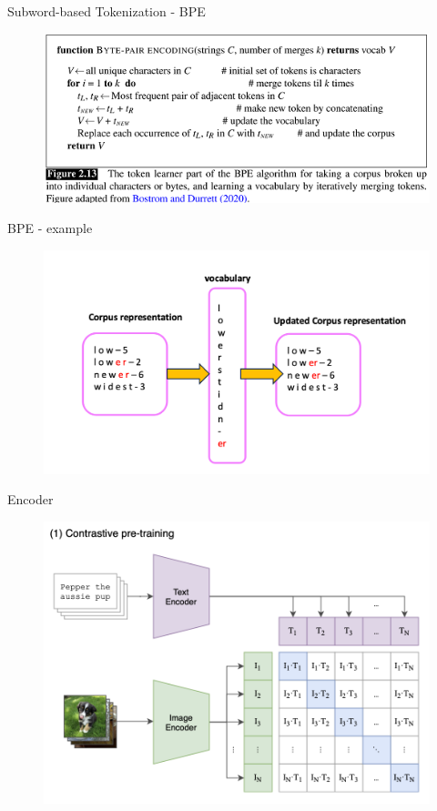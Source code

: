 \documentclass[aspectratio=169,xcolor=dvipsnames]{beamer}
\begin{document}
\begin{frame}{Subword-based Tokenization - BPE}
    
    \begin{figure}
        \centering
        \includegraphics[width=0.9\linewidth]{figures/BPE.png}
        \label{BPE_example}
    \end{figure}
    
\end{frame}



\begin{frame}{BPE - example}
    \begin{figure}
        \centering
        \includegraphics[width=0.9\linewidth]{figures/BPE_demo.png}
        \label{BPE_demo}
    \end{figure}
\end{frame}


\begin{frame}{Encoder}
    \begin{figure}
        \centering
        \includegraphics[width=0.7 \linewidth]{figures/contrastive_pre_training.png}
    \end{figure}
\end{frame}
\end{document}
